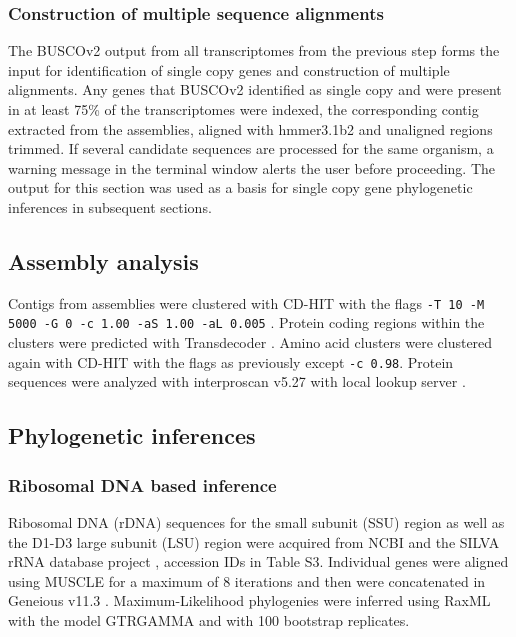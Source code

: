 \documentclass[fleqn,10pt,lineno]{wlpeerj} %
\begin{document}
\subsubsection*{Construction of multiple sequence alignments}
The BUSCOv2 output from all transcriptomes from the previous step forms the input for identification of single copy genes and construction of multiple alignments. 
Any genes that BUSCOv2 identified as single copy and were present in at least 75\% of the transcriptomes were indexed, the corresponding contig extracted from the assemblies, aligned with hmmer3.1b2 \citep{eddy2015hmmer} and unaligned regions trimmed.
If several candidate sequences are processed for the same organism, a warning message in the terminal window alerts the user before proceeding. 
The output for this section was used as a basis for single copy gene phylogenetic inferences in subsequent sections.

\subsection*{Assembly analysis}
Contigs from assemblies were clustered with CD-HIT with the flags \texttt{-T 10 -M 5000 -G 0 -c 1.00 -aS 1.00 -aL 0.005} \citep{fu2012cd}. 
Protein coding regions within the clusters were predicted with Transdecoder \citep{haas2016transdecoder}. 
Amino acid clusters were clustered again with CD-HIT with the flags as previously except \texttt{-c 0.98}.
Protein sequences were analyzed with interproscan v5.27 with local lookup server \citep{quevillon2005interproscan}.

\subsection*{Phylogenetic inferences}
\subsubsection*{Ribosomal DNA based inference}
Ribosomal DNA (rDNA) sequences for the small subunit (SSU) region as well as the D1-D3 large subunit (LSU) region were acquired from NCBI \citep{coordinators2017database} and the SILVA rRNA database project \citep{silvaproj}, accession IDs in Table S3. 
Individual genes were aligned using MUSCLE \citep{edgar2004muscle} for a maximum of 8 iterations and then were concatenated in Geneious v11.3 \citep{kearse2012geneious}.
Maximum-Likelihood phylogenies were inferred using RaxML \citep{stamatakis2014raxml} with the model GTRGAMMA and with 100 bootstrap replicates.
\end{document}
